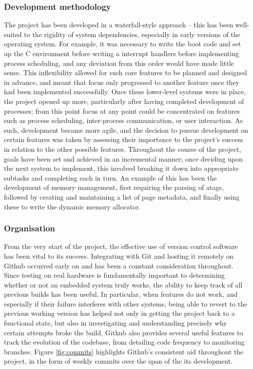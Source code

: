     \subsubsection{Development methodology}
        The project has been developed in a waterfall-style approach -- this has
        been well-suited to the rigidity of system dependencies, especially in
        early versions of the operating system. For example, it was necessary to
        write the boot code and set up the C environment before writing a
        interrupt handlers before implementing process scheduling, and any
        deviation from this order would have made little sense. This
        inflexibility allowed for such core features to be planned and designed
        in advance, and meant that focus only progressed to another feature once
        they had been implemented successfully. Once these lower-level systems
        were in place, the project opened up more, particularly after having
        completed development of processes; from this point focus at any point
        could be concentrated on features such as process scheduling,
        inter-process communication, or user interaction. As such, development
        became more agile, and the decision to pursue development on certain
        features was taken by assessing their importance to the project's
        success in relation to the other possible features. Throughout the
        course of the project, goals have been set and achieved in an
        incremental manner; once deciding upon the next system to implement,
        this involved breaking it down into appropriate subtasks and completing
        each in turn. An example of this has been the development of memory
        management, first requiring the parsing of atags, followed by creating
        and maintaining a list of page metadata, and finally using these to
        write the dynamic memory allocator.

    \subsubsection{Organisation}
        From the very start of the project, the effective use of version control
        software has been vital to its success. Integrating with Git and hosting
        it remotely on Github occurred early on and has been a constant
        consideration throughout. Since testing on real hardware is
        fundamentally important to determining whether or not an embedded system
        truly works, the ability to keep track of all previous builds has been
        useful.  In particular, when features do not work, and especially if
        their failure interferes with other systems, being able to revert to the
        previous working version has helped not only in getting the project back
        to a functional state, but also in investigating and understanding
        precisely why certain attempts broke the build. Github also provides
        several useful features to track the evolution of the codebase, from
        detailing code frequency to monitoring branches. Figure
        \ref{fig:commits} highlights Github's consistent aid throughout the
        project, in the form of weekly commits over the span of the its
        development.

